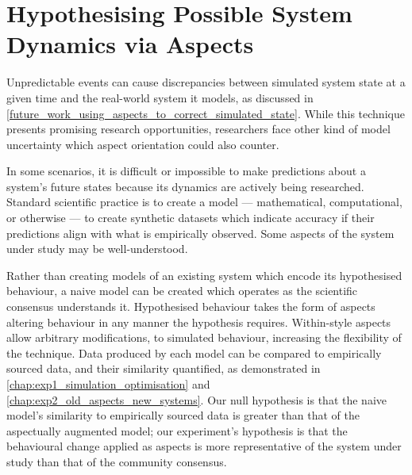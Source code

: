 


\section{Hypothesising Possible System Dynamics via Aspects}


Unpredictable events can cause discrepancies between simulated system state at a
given time and the real-world system it models, as discussed in
\cref{future_work_using_aspects_to_correct_simulated_state}. While this
technique presents promising research opportunities, researchers face other kind
of model uncertainty which aspect orientation could also counter.

In some scenarios, it is difficult or impossible to make predictions about a
system's future states because its dynamics are actively being researched.
Standard scientific practice is to create a model --- mathematical,
computational, or otherwise --- to create synthetic datasets which indicate
accuracy if their predictions align with what is empirically observed.
 Some aspects of the system under study may be
well-understood.

Rather than creating models of an existing system which encode its hypothesised
behaviour, a naive model can be created which operates as the scientific
consensus understands it. Hypothesised behaviour takes the form of aspects
altering behaviour in any manner the hypothesis requires. Within-style aspects
allow arbitrary modifications, to simulated behaviour, increasing the
flexibility of the technique. Data produced by each model can be compared to
empirically sourced data, and their similarity quantified, as demonstrated in
\cref{chap:exp1_simulation_optimisation} and
\cref{chap:exp2_old_aspects_new_systems}. Our null hypothesis is that the naive
model's similarity to empirically sourced data is greater than that of the
aspectually augmented model; our experiment's hypothesis is that the behavioural
change applied as aspects is more representative of the system under study than
that of the community consensus.

